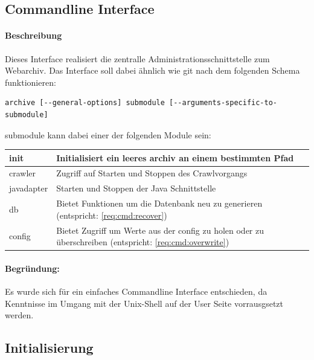 

\subsection{Commandline Interface}
\label{sub:commandline_interface}
\paragraph{Beschreibung}
\label{par:beschreibung}
Dieses Interface realisiert die zentralle Administrationsschnittstelle zum Webarchiv. 
Das Interface soll dabei ähnlich wie git nach dem folgenden Schema funktionieren:
\begin{verbatim}
archive [--general-options] submodule [--arguments-specific-to-submodule]
\end{verbatim}
submodule kann dabei einer der folgenden Module sein:
\begin{table}[h]
\centering
\begin{tabular}{|l|l|}
    \hline
        init & Initialisiert ein leeres archiv an einem bestimmten Pfad \\
    \hline
        crawler & Zugriff auf Starten und Stoppen des Crawlvorgangs \\
    \hline
        javadapter & Starten und Stoppen der Java Schnittstelle \\
    \hline
    db & Bietet Funktionen um die Datenbank neu zu generieren
    (entspricht: \ref{req:cmd:recover}) \\
    \hline
        config & Bietet Zugriff um Werte aus der config zu holen oder zu überschreiben
        (entspricht: \ref{req:cmd:overwrite}) \\
    \hline
\end{tabular}
\end{table}

\paragraph{Begründung:}
\label{par:begr_ndung_}
Es wurde sich für ein einfaches Commandline Interface entschieden, da
Kenntnisse im Umgang mit der Unix-Shell auf der User Seite vorrausgsetzt
werden.


\subsection{Initialisierung} 
\label{sub:initialisierung}
